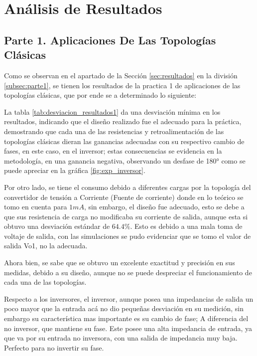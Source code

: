 
\section{Análisis de Resultados}

    \subsection{Parte 1. Aplicaciones De Las Topologías Clásicas}

        Como se observan en el apartado de la Sección \ref{sec:resultados} en la división \ref{subsec:parte1}, se tienen los resultados de la practica 1 de aplicaciones de las topologías clásicas, que por ende se a determinado lo siguiente:

        La tabla \ref{tab:desviacion_resultados1} da una desviación mínima en los resultados, indicando que el diseño realizado fue el adecuado para la práctica, demostrando que cada una de las resistencias y retroalimentación de las topologías clásicas dieran las ganancias adecuadas con su respectivo cambio de fases, en este caso, en el inversor; estas consecuencias se evidencia en la metodología, en una ganancia negativa, observando un desfase de 180° como se puede apreciar en la gráfica \ref{fig:exp_inversor}.

        Por otro lado, se tiene el consumo debido a diferentes cargas por la topología del convertidor de tensión a Corriente (Fuente de corriente) donde en lo teórico se tomo en cuenta para $1mA$, sin embargo, el diseño fue adecuado, esto se debe a que sus resistencia de carga no modificaba su corriente de salida, aunque esta si obtuvo una desviación estándar de $64.4\%$. Esto es debido a una mala toma de voltaje de salida, con las simulaciones se pudo evidenciar que se tomo el valor de salida Vo1, no la adecuada. 

        Ahora bien, se sabe que se obtuvo un excelente exactitud y precisión en sus medidas, debido a su diseño, aunque no se puede despreciar el funcionamiento de cada una de las topologías.

        Respecto a los inversores, el inversor, aunque posea una impedancias de salida un poco mayor que la entrada acá no dio pequeñas desviación en su medición, sin embargo su característica mas importante es su cambio de fase; A diferencia del no inversor, que mantiene su fase. Este posee una alta impedancia de entrada, ya que va por su entrada no inversora, con una salida de impedancia muy baja. Perfecto para no invertir su fase.

